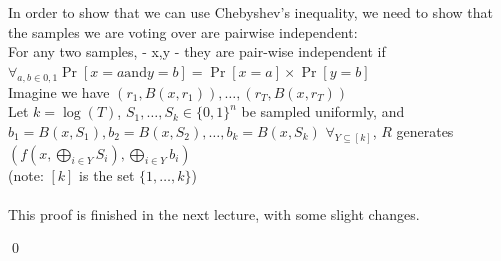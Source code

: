 \documentclass[12pt]{tufte-book}
\begin{document}
In order to show that we can use Chebyshev's inequality, we need to show that the samples we are voting over are pairwise independent:\\
For any two samples, - x,y - they are pair-wise independent if $\forall_{a,b \in {0,1}} \Pr[x=a \text{and} y=b] = \Pr[x=a] \times \Pr[y=b]$\\

	Imagine we have $(r_1, B(x, r_1)), \ldots, (r_T, B(x,r_T))$\\
	Let $k = \log(T)$, $S_1, \ldots, S_k \in \{0,1\}^n$ be sampled uniformly, and $b_1 = B(x, S_1), b_2 = B(x, S_2), \ldots, b_k = B(x, S_k)$
	$\forall_{Y \subseteq [k]}$, $R$ generates $(f(x, \bigoplus_{i \in Y} S_i), \bigoplus_{i \in Y} b_i)$\\
	(note: $[k]$ is the set $\{1,\ldots, k\}$)\\
	\\
	This proof is finished in the next lecture, with some slight changes.

\qed
\end{document}
